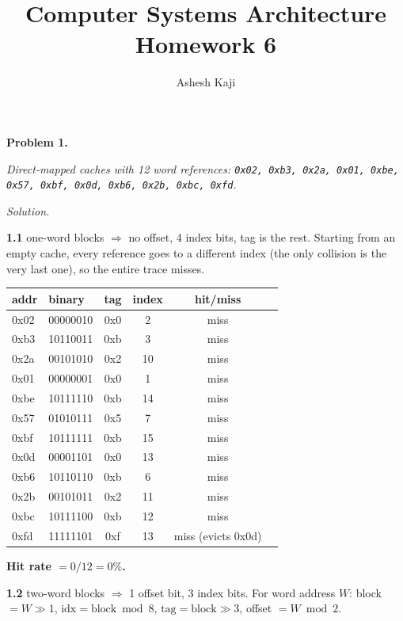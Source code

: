 \documentclass[12pt]{article}
\title{Computer Systems Architecture\\Homework 6}
\author{Ashesh Kaji}
\date{}
\newcommand{\problem}[1]{\vspace{0.8em}\noindent\textbf{Problem #1.}\vspace{0.35em}}
\newenvironment{solution}{\par\noindent\textit{Solution.}\ }{\par\vspace{1.1em}}
\newcommand{\subproblem}[1]{\par\vspace{0.45em}\noindent\textbf{#1}\quad}
\newcommand{\assigntext}[1]{\par\vspace{0.25em}\small\textit{#1}\par\vspace{0.35em}}
\begin{document}
\maketitle

\problem{1}
\assigntext{Direct-mapped caches with 12 word references: \texttt{0x02, 0xb3, 0x2a, 0x01, 0xbe, 0x57, 0xbf, 0x0d, 0xb6, 0x2b, 0xbc, 0xfd}.}

\begin{solution}
\subproblem{1.1} 16 one-word blocks $\Rightarrow$ no offset, 4 index bits, tag is the rest. Starting from an empty cache, every reference goes to a different index (the only collision is the very last one), so the entire trace misses.

\begin{center}
\small
\begin{tabular}{@{}llcccc@{}}
\toprule
addr & binary & tag & index & hit/miss \\
\midrule
0x02 & 00000010 & 0x0 & 2  & miss \\
0xb3 & 10110011 & 0xb & 3  & miss \\
0x2a & 00101010 & 0x2 & 10 & miss \\
0x01 & 00000001 & 0x0 & 1  & miss \\
0xbe & 10111110 & 0xb & 14 & miss \\
0x57 & 01010111 & 0x5 & 7  & miss \\
0xbf & 10111111 & 0xb & 15 & miss \\
0x0d & 00001101 & 0x0 & 13 & miss \\
0xb6 & 10110110 & 0xb & 6  & miss \\
0x2b & 00101011 & 0x2 & 11 & miss \\
0xbc & 10111100 & 0xb & 12 & miss \\
0xfd & 11111101 & 0xf & 13 & miss (evicts 0x0d) \\
\bottomrule
\end{tabular}
\end{center}

\textbf{Hit rate $= 0/12 = 0\%$.}

\subproblem{1.2} 8 two-word blocks $\Rightarrow$ 1 offset bit, 3 index bits. For word address $W$: block $= W{\gg}1$, $\text{idx}=\text{block}\bmod 8$, $\text{tag}=\text{block}{\gg}3$, offset $= W \bmod 2$.


\end{solution}
\end{document}
